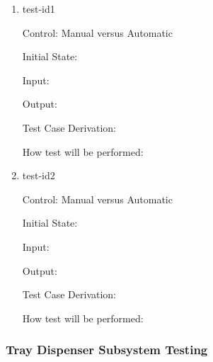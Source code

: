 \documentclass[12pt, titlepage]{article}
\begin{document}
\begin{enumerate}

\item{test-id1\\}

Control: Manual versus Automatic
					
Initial State: 
					
Input: 
					
Output: 

Test Case Derivation: 
					
How test will be performed: 
					
\item{test-id2\\}

Control: Manual versus Automatic
					
Initial State: 
					
Input: 
					
Output: 

Test Case Derivation: 

How test will be performed: 

\end{enumerate}

\subsubsection{Tray Dispenser Subsystem Testing}
\end{document}
